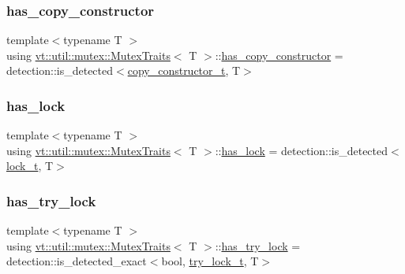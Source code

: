 \subsubsection{\texorpdfstring{has\+\_\+copy\+\_\+constructor}{has\_copy\_constructor}}
{\footnotesize\ttfamily template$<$typename T $>$ \\
using \hyperlink{structvt_1_1util_1_1mutex_1_1_mutex_traits}{vt\+::util\+::mutex\+::\+Mutex\+Traits}$<$ T $>$\+::\hyperlink{structvt_1_1util_1_1mutex_1_1_mutex_traits_abc2f711a1503efeeb8ab0659e5f8a560}{has\+\_\+copy\+\_\+constructor} =  detection\+::is\+\_\+detected$<$\hyperlink{structvt_1_1util_1_1mutex_1_1_mutex_traits_a300c2a638d97f9eb3c63ddd709e422a5}{copy\+\_\+constructor\+\_\+t}, T$>$}

\mbox{\label{structvt_1_1util_1_1mutex_1_1_mutex_traits_a9fda8e52286ca180edae0c3ba2a0ca5e}} 
\subsubsection{\texorpdfstring{has\+\_\+lock}{has\_lock}}
{\footnotesize\ttfamily template$<$typename T $>$ \\
using \hyperlink{structvt_1_1util_1_1mutex_1_1_mutex_traits}{vt\+::util\+::mutex\+::\+Mutex\+Traits}$<$ T $>$\+::\hyperlink{structvt_1_1util_1_1mutex_1_1_mutex_traits_a9fda8e52286ca180edae0c3ba2a0ca5e}{has\+\_\+lock} =  detection\+::is\+\_\+detected$<$\hyperlink{structvt_1_1util_1_1mutex_1_1_mutex_traits_ab7d7468978f0094f267e7f11665fedeb}{lock\+\_\+t}, T$>$}

\mbox{\label{structvt_1_1util_1_1mutex_1_1_mutex_traits_a07dcb11ab208e370364fb650ca014181}} 
\subsubsection{\texorpdfstring{has\+\_\+try\+\_\+lock}{has\_try\_lock}}
{\footnotesize\ttfamily template$<$typename T $>$ \\
using \hyperlink{structvt_1_1util_1_1mutex_1_1_mutex_traits}{vt\+::util\+::mutex\+::\+Mutex\+Traits}$<$ T $>$\+::\hyperlink{structvt_1_1util_1_1mutex_1_1_mutex_traits_a07dcb11ab208e370364fb650ca014181}{has\+\_\+try\+\_\+lock} =  detection\+::is\+\_\+detected\+\_\+exact$<$bool, \hyperlink{structvt_1_1util_1_1mutex_1_1_mutex_traits_a444680f011349740337d02124ac0bdea}{try\+\_\+lock\+\_\+t}, T$>$}

